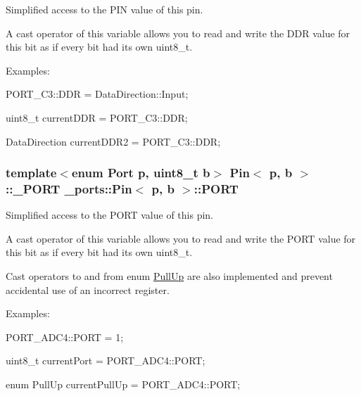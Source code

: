 Simplified access to the P\+IN value of this pin. 

A cast operator of this variable allows you to read and write the D\+DR value for this bit as if every bit had its own uint8\+\_\+t.

Examples\+:


\begin{DoxyItemize}
\item {\ttfamily P\+O\+R\+T\+\_\+\+C3\+::\+D\+DR = Data\+Direction\+::\+Input;}
\item {\ttfamily uint8\+\_\+t current\+D\+DR = P\+O\+R\+T\+\_\+\+C3\+::\+D\+DR;}
\item {\ttfamily Data\+Direction current\+D\+D\+R2 = P\+O\+R\+T\+\_\+\+C3\+::\+D\+DR;} 
\end{DoxyItemize}
\subsubsection[{\texorpdfstring{P\+O\+RT}{PORT}}]{\setlength{\rightskip}{0pt plus 5cm}template$<$enum Port p, uint8\+\_\+t b$>$ {\bf Pin}$<$ p, b $>$\+::{\bf \+\_\+\+P\+O\+RT} {\bf \+\_\+ports\+::\+Pin}$<$ p, b $>$\+::P\+O\+RT\hspace{0.3cm}{\ttfamily [static]}}\hypertarget{struct__ports_1_1Pin_a7ae4c8a631070ea0652b8ea59416bc37}{}\label{struct__ports_1_1Pin_a7ae4c8a631070ea0652b8ea59416bc37}


Simplified access to the P\+O\+RT value of this pin. 

A cast operator of this variable allows you to read and write the P\+O\+RT value for this bit as if every bit had its own uint8\+\_\+t.

Cast operators to and from enum \hyperlink{namespace__ports_a39c7c69d8e84949d7f7680e5b25a3742}{Pull\+Up} are also implemented and prevent accidental use of an incorrect register.

Examples\+:


\begin{DoxyItemize}
\item {\ttfamily P\+O\+R\+T\+\_\+\+A\+D\+C4\+::\+P\+O\+RT = 1;}
\item {\ttfamily uint8\+\_\+t current\+Port = P\+O\+R\+T\+\_\+\+A\+D\+C4\+::\+P\+O\+RT;}
\item {\ttfamily enum Pull\+Up current\+Pull\+Up = P\+O\+R\+T\+\_\+\+A\+D\+C4\+::\+P\+O\+RT;} 
\end{DoxyItemize}
